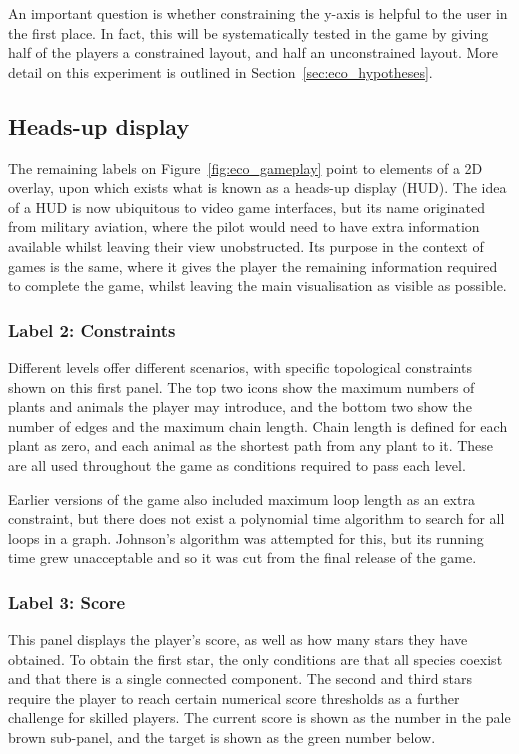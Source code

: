 An important question is whether constraining the y-axis is helpful to the user in the first place. In fact, this will be systematically tested in the game by giving half of the players a constrained layout, and half an unconstrained layout. More detail on this experiment is outlined in Section~\ref{sec:eco_hypotheses}.

\subsection{Heads-up display}
\label{sec:HUD}
The remaining labels on Figure~\ref{fig:eco_gameplay} point to elements of a 2D overlay, upon which exists what is known as a heads-up display (HUD). The idea of a HUD is now ubiquitous to video game interfaces, but its name originated from military aviation, where the pilot would need to have extra information available whilst leaving their view unobstructed. 
Its purpose in the context of games is the same, where it gives the player the remaining information required to complete the game, whilst leaving the main visualisation as visible as possible.

\subsubsection{Label 2: Constraints}
Different levels offer different scenarios, with specific topological constraints shown on this first panel. The top two icons show the maximum numbers of plants and animals the player may introduce, and the bottom two show the number of edges and the maximum chain length. Chain length is defined for each plant as zero, and each animal as the shortest path from any plant to it. These are all used throughout the game as conditions required to pass each level.

Earlier versions of the game also included maximum loop length as an extra constraint, but there does not exist a polynomial time algorithm to search for all loops in a graph. Johnson's algorithm \cite{Johnson1975} was attempted for this, but its running time grew unacceptable and so it was cut from the final release of the game.

\subsubsection{Label 3: Score}
This panel displays the player's score, as well as how many stars they have obtained. To obtain the first star, the only conditions are that all species coexist and that there is a single connected component. The second and third stars require the player to reach certain numerical score thresholds as a further challenge for skilled players. The current score is shown as the number in the pale brown sub-panel, and the target is shown as the green number below.

